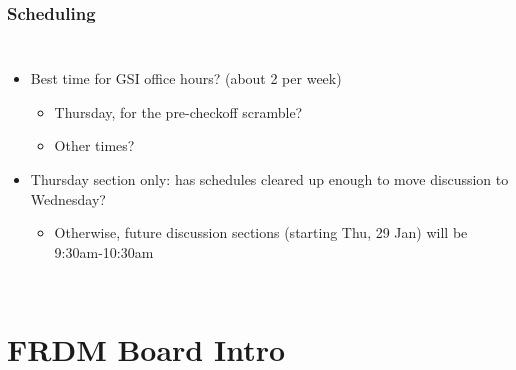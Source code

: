 \documentclass{beamer}
\begin{document}
\begin{frame}
\frametitle{Scheduling}
\begin{columns}[t]
\begin{itemize}
  \item Best time for GSI office hours? (about 2 per week)
  \begin{itemize}
    \item Thursday, for the pre-checkoff scramble?
    \item Other times?
  \end{itemize}
  \item Thursday section only: has schedules cleared up enough to move discussion to Wednesday?
  \begin{itemize}
    \item Otherwise, future discussion sections (starting Thu, 29 Jan) will be 9:30am-10:30am
  \end{itemize}
\end{itemize}

\end{columns}
\end{frame}

\section{FRDM Board Intro} %
\end{document}
